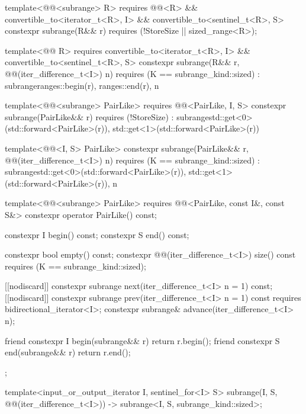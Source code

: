 \begin{codeblock}
{{    template<@@<subrange> R>
      requires @@<R> &&
        convertible_to<iterator_t<R>, I> && convertible_to<sentinel_t<R>, S>
    constexpr subrange(R&& r) requires (!StoreSize || sized_range<R>);

    template<@@ R>
      requires convertible_to<iterator_t<R>, I> && convertible_to<sentinel_t<R>, S>
    constexpr subrange(R&& r, @@(iter_difference_t<I>) n)
      requires (K == subrange_kind::sized)
        : subrange{ranges::begin(r), ranges::end(r), n}
    {}

    template<@@<subrange> PairLike>
      requires @@<PairLike, I, S>
    constexpr subrange(PairLike&& r) requires (!StoreSize)
      : subrange{std::get<0>(std::forward<PairLike>(r)),
                 std::get<1>(std::forward<PairLike>(r))}
    {}

    template<@@<I, S> PairLike>
    constexpr subrange(PairLike&& r, @@(iter_difference_t<I>) n)
      requires (K == subrange_kind::sized)
      : subrange{std::get<0>(std::forward<PairLike>(r)),
                 std::get<1>(std::forward<PairLike>(r)), n}
    {}

    template<@@<subrange> PairLike>
      requires @@<PairLike, const I&, const S&>
    constexpr operator PairLike() const;

    constexpr I begin() const;
    constexpr S end() const;

    constexpr bool empty() const;
    constexpr @@(iter_difference_t<I>) size() const
      requires (K == subrange_kind::sized);

    [[nodiscard]] constexpr subrange next(iter_difference_t<I> n = 1) const;
    [[nodiscard]] constexpr subrange prev(iter_difference_t<I> n = 1) const
      requires bidirectional_iterator<I>;
    constexpr subrange& advance(iter_difference_t<I> n);

    friend constexpr I begin(subrange&& r) { return r.begin(); }
    friend constexpr S end(subrange&& r) { return r.end(); }
  };

  template<input_or_output_iterator I, sentinel_for<I> S>
    subrange(I, S, @@(iter_difference_t<I>)) ->
      subrange<I, S, subrange_kind::sized>;

}
\end{codeblock}
